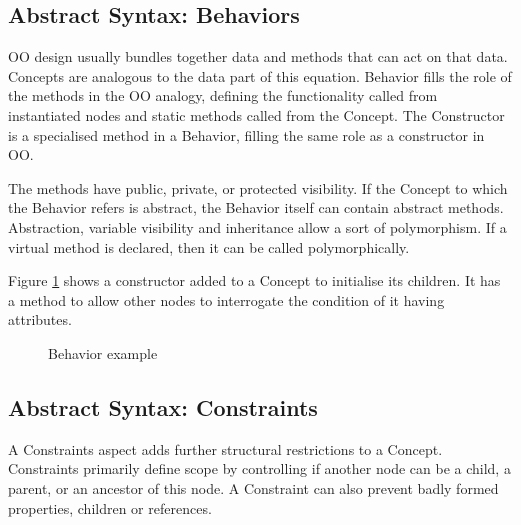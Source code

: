 \subsection{Abstract Syntax: Behaviors}
OO design usually bundles together data and methods that can act on that data.
Concepts are analogous to the data part of this equation.
Behavior fills the role of the methods in the OO analogy, defining the functionality called from instantiated nodes and static methods called from the Concept.
The Constructor is a specialised method in a Behavior, filling the same role as a constructor in OO.

The methods have public, private, or protected visibility.
If the Concept to which the Behavior refers is abstract, the Behavior itself can contain abstract methods.
Abstraction, variable visibility and inheritance allow a sort of polymorphism.
If a virtual method is declared, then it can be called polymorphically.

Figure \ref{fig:behavior_example} shows a constructor added to a Concept to initialise its children.
It has a method to allow other nodes to interrogate the condition of it having attributes.

\begin{figure}
    \centering
    \caption{Behavior example}
    \label{fig:behavior_example}
\end{figure}

\subsection{Abstract Syntax: Constraints}
A Constraints aspect adds further structural restrictions to a Concept.
Constraints primarily define scope by controlling if another node can be a child, a parent, or an ancestor of this node.
A Constraint can also prevent badly formed properties, children or references.

